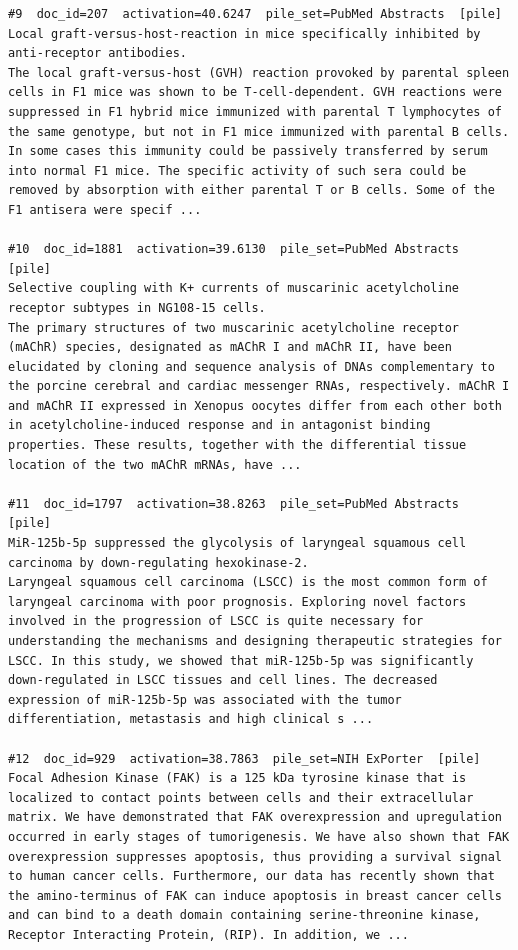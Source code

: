\begin{verbatim}
#9  doc_id=207  activation=40.6247  pile_set=PubMed Abstracts  [pile]
Local graft-versus-host-reaction in mice specifically inhibited by anti-receptor antibodies.
The local graft-versus-host (GVH) reaction provoked by parental spleen cells in F1 mice was shown to be T-cell-dependent. GVH reactions were suppressed in F1 hybrid mice immunized with parental T lymphocytes of the same genotype, but not in F1 mice immunized with parental B cells. In some cases this immunity could be passively transferred by serum into normal F1 mice. The specific activity of such sera could be removed by absorption with either parental T or B cells. Some of the F1 antisera were specif ...

#10  doc_id=1881  activation=39.6130  pile_set=PubMed Abstracts  [pile]
Selective coupling with K+ currents of muscarinic acetylcholine receptor subtypes in NG108-15 cells.
The primary structures of two muscarinic acetylcholine receptor (mAChR) species, designated as mAChR I and mAChR II, have been elucidated by cloning and sequence analysis of DNAs complementary to the porcine cerebral and cardiac messenger RNAs, respectively. mAChR I and mAChR II expressed in Xenopus oocytes differ from each other both in acetylcholine-induced response and in antagonist binding properties. These results, together with the differential tissue location of the two mAChR mRNAs, have ...

#11  doc_id=1797  activation=38.8263  pile_set=PubMed Abstracts  [pile]
MiR-125b-5p suppressed the glycolysis of laryngeal squamous cell carcinoma by down-regulating hexokinase-2.
Laryngeal squamous cell carcinoma (LSCC) is the most common form of laryngeal carcinoma with poor prognosis. Exploring novel factors involved in the progression of LSCC is quite necessary for understanding the mechanisms and designing therapeutic strategies for LSCC. In this study, we showed that miR-125b-5p was significantly down-regulated in LSCC tissues and cell lines. The decreased expression of miR-125b-5p was associated with the tumor differentiation, metastasis and high clinical s ...

#12  doc_id=929  activation=38.7863  pile_set=NIH ExPorter  [pile]
Focal Adhesion Kinase (FAK) is a 125 kDa tyrosine kinase that is localized to contact points between cells and their extracellular matrix. We have demonstrated that FAK overexpression and upregulation occurred in early stages of tumorigenesis. We have also shown that FAK overexpression suppresses apoptosis, thus providing a survival signal to human cancer cells. Furthermore, our data has recently shown that the amino-terminus of FAK can induce apoptosis in breast cancer cells and can bind to a death domain containing serine-threonine kinase, Receptor Interacting Protein, (RIP). In addition, we ...


\end{verbatim}
